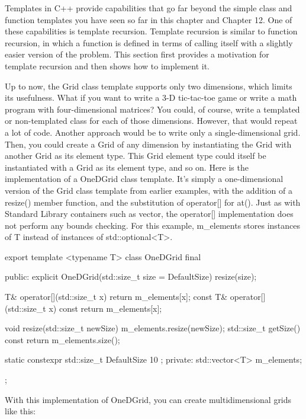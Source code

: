 
Templates in C++ provide capabilities that go far beyond the simple class and function templates you have seen so far in this chapter and Chapter 12. One of these capabilities is template recursion. Template recursion is similar to function recursion, in which a function is defined in terms of calling itself with a slightly easier version of the problem. This section first provides a motivation for template recursion and then shows how to implement it.


Up to now, the Grid class template supports only two dimensions, which limits its usefulness. What if you want to write a 3-D tic-tac-toe game or write a math program with four-dimensional matrices? You could, of course, write a templated or non-templated class for each of those dimensions. However, that would repeat a lot of code. Another approach would be to write only a single-dimensional grid. Then, you could create a Grid of any dimension by instantiating the Grid with another Grid as its element type. This Grid element type could itself be instantiated with a Grid as its element type, and so on. Here is the implementation of a OneDGrid class template. It’s simply a one-dimensional version of the Grid class template from earlier examples, with the addition of a resize() member function, and the substitution of operator[] for at(). Just as with Standard Library containers such as vector, the operator[] implementation does not perform any bounds checking. For this example, m\_elements stores instances of T instead of instances of std::optional<T>.

\begin{cpp}
export template <typename T>
class OneDGrid final
{
    public:
        explicit OneDGrid(std::size_t size = DefaultSize) { resize(size); }

        T& operator[](std::size_t x) { return m_elements[x]; }
        const T& operator[](std::size_t x) const { return m_elements[x]; }

        void resize(std::size_t newSize) { m_elements.resize(newSize); }
        std::size_t getSize() const { return m_elements.size(); }

        static constexpr std::size_t DefaultSize { 10 };
    private:
        std::vector<T> m_elements;
};
\end{cpp}

With this implementation of OneDGrid, you can create multidimensional grids like this:

